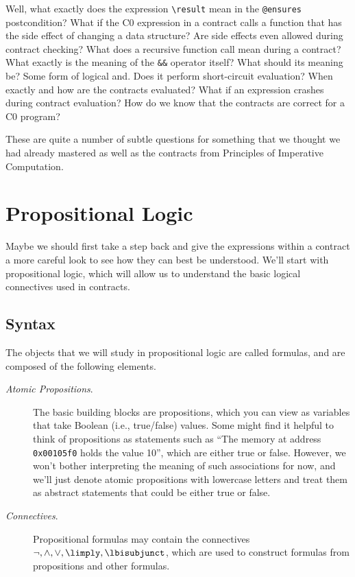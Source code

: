 \documentclass[11pt,twoside]{scrartcl}
\begin{document}
Well, what exactly does the expression \verb'\result' mean in the \texttt{@ensures} postcondition?
What if the C0 expression in a contract calls a function that has the side effect of changing a data structure?
Are side effects even allowed during contract checking?
What does a recursive function call mean during a contract?
What exactly is the meaning of the \verb'&&' operator itself?
What should its meaning be?
Some form of logical and.
Does it perform short-circuit evaluation?
When exactly and how are the contracts evaluated?
What if an expression crashes during contract evaluation?
How do we know that the contracts are correct for a C0 program?

These are quite a number of subtle questions for something that we thought we had already mastered as well as the contracts from Principles of Imperative Computation.


\section{Propositional Logic}

Maybe we should first take a step back and give the expressions within a contract a more careful look to see how they can best be understood. We'll start with propositional logic, which will allow us to understand the basic logical connectives used in contracts.

\subsection{Syntax}

The objects that we will study in propositional logic are called formulas, and are composed of the following elements.
\begin{description}
  \item[\textit{Atomic Propositions}.] The basic building blocks are propositions, which you can view as variables that take Boolean (i.e., true/false) values. Some might find it helpful to think of propositions as statements such as ``The memory at address \verb'0x00105f0' holds the value 10'', which are either true or false. However, we won't bother interpreting the meaning of such associations for now, and we'll just denote atomic propositions with lowercase letters and treat them as abstract statements that could be either true or false.
  \item[\textit{Connectives}.] Propositional formulas may contain the connectives $\lnot, \land, \lor, \limply, \lbisubjunct$, which are used to construct formulas from propositions and other formulas.
\end{description}
\end{document}
